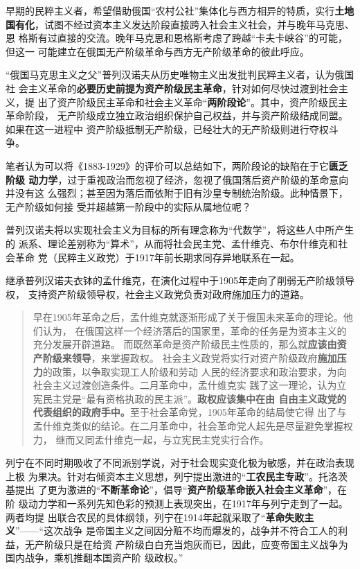 
早期的民粹主义者，希望借助俄国“农村公社”集体化与西方相异的特质，实行\textbf{土地
  国有化}，试图不经过资本主义发达阶段直接跨入社会主义社会，并与晚年马克思、恩
格斯有过直接的交流。晚年马克思和恩格斯考虑了跨越“卡夫卡峡谷”的可能，但这一
可能建立在俄国无产阶级革命与西方无产阶级革命的彼此呼应。\cite{mamincui}

“俄国马克思主义之父”普列汉诺夫从历史唯物主义出发批判民粹主义者，认为俄国社
会主义革命的\textbf{必要历史前提为资产阶级民主革命}，针对如何尽快过渡到社会主义，提
出了资产阶级民主革命和社会主义革命“\textbf{两阶段论}”。其中，资产阶级民主革命阶段，
无产阶级成立独立政治组织保护自己权益，并与资产阶级结成同盟。如果在这一进程中
资产阶级抵制无产阶级，已经壮大的无产阶级则进行夺权斗争。

笔者认为可以将《1883-1929》的评价可以总结如下，两阶段论的缺陷在于它\textbf{匮乏阶级
  动力学}，过于重视政治而忽视了经济，忽视了俄国落后资产阶级的革命意向并没有这
么强烈；甚至因为落后而依附于旧有沙皇专制统治阶级。此种情景下，无产阶级如何接
受并超越第一阶段中的实际从属地位呢？

普列汉诺夫将以实现社会主义为目标的所有理念称为“代数学”，将这些人中所产生的
派系、理论差别称为“算术”，从而将社会民主党、孟什维克、布尔什维克和社会革命
党（民粹主义政党）于1917年前长期求同存异地联系在一起。

继承普列汉诺夫衣钵的孟什维克，在演化过程中于1905年走向了削弱无产阶级领导权，
支持资产阶级领导权，社会主义政党负责对政府施加压力的道路。
\begin{quotation}
  早在1905年革命之后，孟什维克就逐渐形成了关于俄国未来革命的理论。他们认为，
  在俄国这样一个经济落后的国家里，革命的任务是为资本主义的充分发展开辟道路。
  而既然革命是资产阶级民主性质的，那么就\textbf{应该由资产阶级来领导}，来掌握政权。
  社会主义政党将实行对资产阶级政府\textbf{施加压力}的政策，以争取实现工人阶级和劳动
  人民的经济要求和政治要求，为向社会主义过渡创造条件。二月革命中，孟什维克实
  践了这一理论，认为立宪民主党是“最有资格执政的民主派”。\textbf{政权应该集中在由
    自由主义政党的代表组织的政府手中。}至于社会革命党，1905年革命的结局使它得
  出了与孟什维克类似的结论。在二月革命中，社会革命党人起先是尽量避免掌握权力，
  继而又同孟什维克一起，与立宪民主党实行合作。
\end{quotation}

列宁在不同时期吸收了不同派别学说，对于社会现实变化极为敏感，并在政治表现上极
为果决。针对右倾资本主义思想，列宁提出激进的“\textbf{工农民主专政}”。托洛茨基提出
了更为激进的“\textbf{不断革命论}”，倡导“\textbf{资产阶级革命嵌入社会主义革命}”，在阶
级动力学和一系列先知色彩的预测上表现突出，在1917年与列宁走到了一起。两者均提
出联合农民的具体纲领，列宁在1914年起就采取了“\textbf{革命失败主义}”——“这次战争
是帝国主义之间因分赃不均而爆发的，战争并不符合工人的利益，无产阶级只是在给资
产阶级白白充当炮灰而已，因此，应变帝国主义战争为国内战争，乘机推翻本国资产阶
级政权。”\cite{shibaizhuyi}

